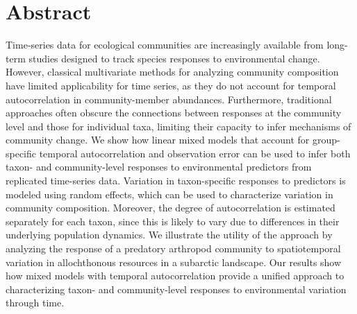 
\section*{Abstract}

Time-series data for ecological communities are increasingly available from
long-term studies designed to track species responses to environmental change.
However, classical multivariate methods for analyzing community composition
have limited applicability for time series, as they do not account for temporal
autocorrelation in community-member abundances.
Furthermore, traditional approaches often obscure the connections between
responses at the community level and those for individual taxa, limiting
their capacity to infer mechanisms of community change.
We show how linear mixed models that account for group-specific temporal autocorrelation 
and observation error can be used to infer both taxon- and community-level responses 
to environmental predictors from replicated time-series data.
Variation in taxon-specific responses to predictors is modeled using
random effects, which can be used to characterize variation in community composition.
Moreover, the degree of autocorrelation is estimated separately for each taxon, since
this is likely to vary due to differences in their underlying population dynamics.
We illustrate the utility of the approach by analyzing the response of a predatory
arthropod community to spatiotemporal variation in allochthonous resources in a
subarctic landscape.
Our results show how mixed models with temporal autocorrelation provide a unified
approach to characterizing taxon- and community-level responses to environmental
variation through time.